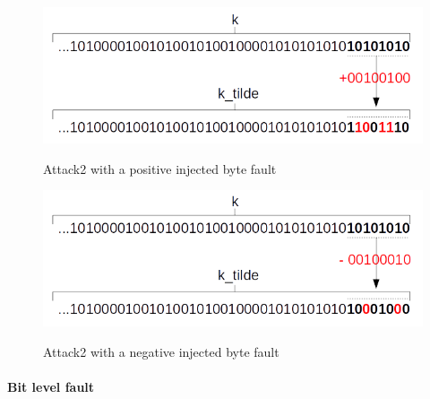\documentclass[11pt,english]{article}
\begin{document}
\begin{figure}[H]
\includegraphics[width=1.0\textwidth]{img/attack2byte.png} \\
\caption{\label{f_etichetta}Attack2 with a positive injected byte fault }
\end{figure}

\begin{figure}[H]
\includegraphics[width=1.0\textwidth]{img/attack2byteneg.png} \\
\caption{\label{f_etichetta}Attack2 with a negative injected byte fault }
\end{figure}


\paragraph{Bit level fault}
\end{document}
